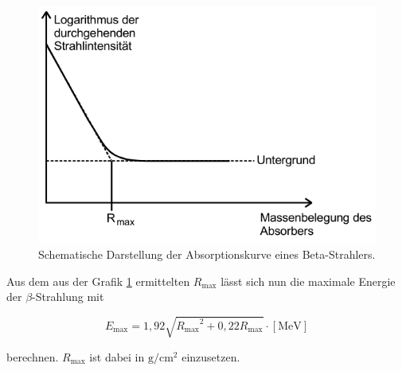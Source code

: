 \begin{figure}
  \centering
  \includegraphics[scale=0.7]{pictures/betaabsorption.png}
  \caption{Schematische Darstellung der Absorptionskurve eines Beta-Strahlers.\cite{sample}}
  \label{fig:betaabsorption}
\end{figure}

Aus dem aus der Grafik \ref{fig:betaabsorption} ermittelten $R_\text{max}$ lässt sich nun die maximale Energie der $\beta$-Strahlung mit

\begin{equation}
  E_\text{max} = 1,92 \sqrt{{R_\text{max}}^2 + 0,22 R_\text{max}} \cdot [\si{\mega\electronvolt}]
  \label{eqn:betaenergie}
\end{equation}

berechnen. $R_\text{max}$ ist dabei in $\si{\gram\per\centi\metre\squared}$ einzusetzen.

\FloatBarrier
